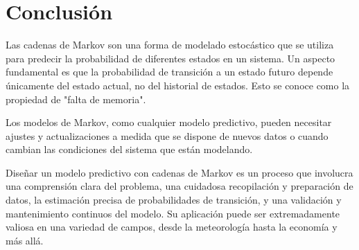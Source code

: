 \documentclass[12pt]{article}
\begin{document}
\newpage
\section*{Conclusión}
Las cadenas de Markov son una forma de modelado estocástico que se utiliza para predecir la probabilidad de diferentes estados en un sistema. Un aspecto fundamental es que la probabilidad de transición a un estado futuro depende únicamente del estado actual, no del historial de estados. Esto se conoce como la propiedad de "falta de memoria".\vspace{1cm}

Los modelos de Markov, como cualquier modelo predictivo, pueden necesitar ajustes y actualizaciones a medida que se dispone de nuevos datos o cuando cambian las condiciones del sistema que están modelando.\vspace{1cm}

Diseñar un modelo predictivo con cadenas de Markov es un proceso que involucra una comprensión clara del problema, una cuidadosa recopilación y preparación de datos, la estimación precisa de probabilidades de transición, y una validación y mantenimiento continuos del modelo. Su aplicación puede ser extremadamente valiosa en una variedad de campos, desde la meteorología hasta la economía y más allá.
\end{document}
